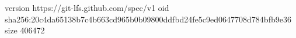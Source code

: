 version https://git-lfs.github.com/spec/v1
oid sha256:20c4da65138b7c4b663cd965b0b09800ddfbd24fe5c9ed0647708d784bfb9e36
size 406472
